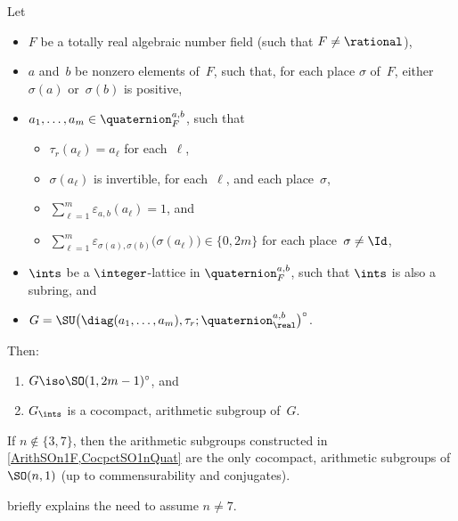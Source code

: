 \begin{prop} \label{CocpctSO1nQuat}
 Let
 \noprelistbreak
 \begin{itemize}
 \item
 $F$ be a totally real algebraic number field\/ \textup(such that $F \neq \rational$\textup),
 \item $a$ and~$b$ be nonzero elements of~$F$,
such that, for each place $\sigma$ of~$F$,
either~$\sigma(a)$ or~$\sigma(b)$ is positive,
 \item $a_1,\ldots,a_m \in \quaternion^{a,b}_F$, such that
 \begin{itemize}
 \item $\tau_r(a_\ell) = a_\ell$ for each~$\ell$,
 \item $\sigma(a_\ell)$ is invertible, for each~$\ell$, and each
place~$\sigma$,
 \item $\sum_{\ell=1}^m \varepsilon_{a,b}(a_\ell) = 1$,
and
 \item $\sum_{\ell=1}^m
\varepsilon_{\sigma(a),\sigma(b)} \bigl(
\sigma(a_\ell) \bigr) \in \{0,2m\}$ for each place~$\sigma
\neq \Id$,
 \end{itemize}
 \item $\ints$ be a $\integer$-lattice in
$\quaternion^{a,b}_F$, such that $\ints$ is also a
subring, and
 \item $G = \SU \bigl( \diag(a_1,\ldots,a_m), \tau_r;
\quaternion^{a,b}_\real \bigr)^\circ$.
 \end{itemize}
 Then:
 \noprelistbreak
 \begin{enumerate}
 \item
 $G \iso \SO(1,2m-1)^\circ$, and
 \item
 $G_{\ints}$ is a cocompact, arithmetic subgroup
of~$G$.
 \end{enumerate}
 \end{prop}

\begin{prop}
 If $n \notin \{3,7\}$, then the arithmetic subgroups constructed in
\cref{ArithSOn1F,CocpctSO1nQuat} are the
only cocompact, arithmetic subgroups of\/ $\SO(n,1)$ \textup(up to
commensurability and conjugates\textup).
 \end{prop}

 briefly explains the
need to assume $n \neq 7$.


